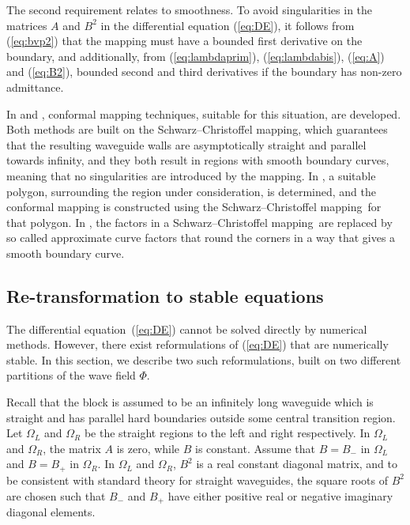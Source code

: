 \documentclass{svjour3}
\renewcommand{\Phi}{\varPhi}
\renewcommand{\vec}[1]{\bm{#1}}
\newcommand{\scm}{Schwarz--Chris\-tof\-fel mapping}
\renewcommand{\Phi}{\varPhi}
\begin{document}
The second requirement relates to smoothness. To avoid singularities
in the matrices $A$ and $B^2$ in the differential equation
(\ref{eq:DE}), it follows from (\ref{eq:bvp2}) that the mapping must
have a bounded first derivative on the boundary, and additionally,
from (\ref{eq:lambdaprim}), (\ref{eq:lambdabis}), (\ref{eq:A}) and
(\ref{eq:B2}), bounded second and third derivatives if the boundary
has non-zero admittance.

In \cite{andersson-outpol:2008} and \cite{andersson-acf:2009},
conformal mapping techniques, suitable for this situation, are
developed. Both methods are built on the \scm, which guarantees that
the resulting waveguide walls are asymptotically straight and parallel
towards infinity, and they both result in regions with smooth boundary
curves, meaning that no singularities are introduced by the
mapping. In \cite{andersson-outpol:2008}, a suitable polygon,
surrounding the region under consideration, is determined, and the
conformal mapping is constructed using the \scm\ for that
polygon. In \cite{andersson-acf:2009}, the factors in a \scm\ are
replaced by so called approximate curve factors that round the corners
in a way that gives a smooth boundary curve.

\subsection{Re-transformation to stable equations}
\label{sec:stableeq}
The differential equation~(\ref{eq:DE}) cannot be solved directly by
numerical methods. However, there exist reformulations of
(\ref{eq:DE}) that are numerically stable.
In this section, we describe two such reformulations, built on two
different partitions of the wave field $\vec\Phi$.

Recall that the block is assumed to be an infinitely long waveguide
which is straight and has parallel hard boundaries outside some
central transition region. Let $\Omega_L$ and $\Omega_R$ be the
straight regions to the left and right respectively.  In $\Omega_L$
and $\Omega_R$, the matrix $A$ is zero, while $B$ is constant. Assume
that $B=B_-$ in $\Omega_L$ and $B=B_+$ in $\Omega_R$. In $\Omega_L$
and $\Omega_R$, $B^2$ is a real constant diagonal matrix, and to be
consistent with standard theory for straight waveguides, the square
roots of $B^2$ are chosen such that $B_-$ and $B_+$ have either
positive real or negative imaginary diagonal elements.
\end{document}

